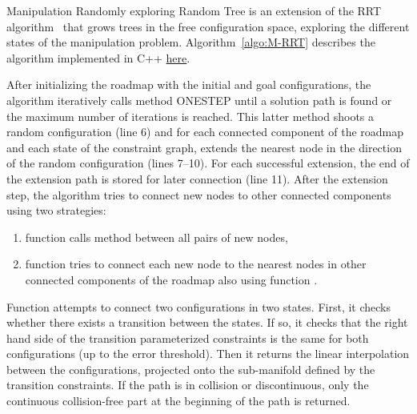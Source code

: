 Manipulation Randomly exploring Random Tree is an extension of the RRT algorithm~\cite{LavKuf01b} that grows trees in the free configuration space, exploring the different states of the manipulation problem. Algorithm~\ref{algo:M-RRT} describes the algorithm implemented in C++ \href{https://github.com/humanoid-path-planner/hpp-manipulation/blob/16369aa291ab1b17ef6176ae8b8b2512b5e6fff7/src/manipulation-planner.cc\#L159}{here}.

After initializing the roadmap with the initial and goal configurations, the algorithm iteratively calls method {\scriptsize ONE}{\small S}{\scriptsize TEP} until a solution path is found or the maximum number of iterations is reached.
This latter method shoots a random configuration (line 6) and for each connected component of the roadmap and each state of the constraint graph, extends the nearest node in the direction of the random configuration (lines 7--10). For each successful extension, the end of the extension path is stored for later connection (line 11). After the extension step, the algorithm tries to connect new nodes to other connected components using two strategies:
\begin{enumerate}
\item function \TRYCONNECTNEWNODES calls method \CONNECT between all pairs of new nodes,
\item function \TRYCONNECTTOROADMAP tries to connect each new node to the nearest nodes in other connected components of the roadmap also using function \CONNECT.
\end{enumerate}
Function \CONNECT attempts to connect two configurations in two states. First, it checks whether there exists a transition between the states. If so, it checks that the right hand side of the transition parameterized constraints is the same for both configurations (up to the error threshold). Then it returns the linear interpolation between the configurations, projected onto the sub-manifold defined by the transition constraints. If the path is in collision {\color{blue}or discontinuous}, only the {\color{blue}continuous} collision-free part at the beginning of the path is returned.

